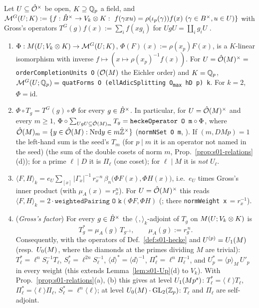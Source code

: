 \begin{lemma}\label{lem:s01-dictionary}
Let $U\subseteq\hat{\mathcal{O}}^\times$ be open, $K\supseteq\mathbb{Q}_p$ a field, and
$\cM^G(U;K):=\{f:\Bhat^\times\to V_k\otimes K:\ f(\gamma xu)=\rho(\iota_p(\gamma))f(x)\ (\gamma\in B^\times,u\in U)\}$ with Gross's operators
$T^G(g)f(x):=\sum_if(xg_i)$ for $UgU=\coprod_ig_iU$ .
\begin{enumerate}[label=(\alph*)]
\item $\Phi:M(U;V_k\otimes K)\to\mathcal{M}^G(U;K)$, $\Phi(F)(x):=\rho(x_p)F(x)$, is a $K$-linear isomorphism with inverse
  $f\mapsto(x\mapsto\rho(x_p)^{-1}f(x))$. For $U=\hat{\mathcal{O}}(M)^\times=$ \texttt{orderCompletionUnits O} ($\mathcal{O}(M)$ the Eichler order) and $K=\mathbb{Q}_p$,
  $\mathcal{M}^G(U;\mathbb{Q}_p)=$ \texttt{quatForms O (ellAdicSplitting O\textsubscript{max} hD p) k}. For $k=2$, $\Phi=\mathrm{id}$.
\item $\Phi\circ T_g=T^G(g)\circ\Phi$ for every $g\in\hat{B}^\times$. In particular, for $U=\hat{\mathcal{O}}(M)^\times$ and every $m\ge1$,
  $\Phi\circ\sum_{UgU\subseteq\hat{\mathcal{O}}(M)_m}T_g=\texttt{heckeOperator O m}\circ\Phi$, where $\hat{\mathcal{O}}(M)_m=\{y\in\hat{\mathcal{O}}(M):\mathrm{Nrd} y\in m\hat{\mathbb{Z}}^\times\}$
  (\texttt{normNSet O m}, ). If $(m,DMp)=1$ the left-hand sum is the seed's $T_m$ (for $p\mid m$ it is an operator not named in the seed) (the sum of the double cosets of norm
  $m$, Prop.~\ref{prop:s01-relations}(d)); for a prime $\ell\mid D$ it is $\Pi_\ell$ (one coset); for $\ell\mid M$ it is \emph{not} $U_\ell$.
\item $\langle F,H\rangle_k=e_U\sum_{[x]}|\Gamma_x|^{-1}\,r_x^{-n}\,\beta_n\big(\Phi F(x),\Phi H(x)\big)$, i.e.\ $e_U$ times Gross's inner product
   (with $\mu_A(x)=r_x^n$). For $U=\hat{\mathcal{O}}(M)^\times$ this reads
  $\langle F,H\rangle_k=2\cdot\texttt{weightedPairing O k}(\Phi F,\Phi H)$ (; there
  \texttt{normWeight x}$\,=r_x^{-1}$).
\item (\emph{Gross's factor}) For every $g\in\hat{B}^\times$ the $\langle\,,\rangle_k$-adjoint of $T_g$ on $M(U;V_k\otimes K)$ is
  \[T_g^*=\mu_A(g)\,T_{g^{-1}},\qquad\mu_A(g):=r_g^{\,n}.\]
  Consequently, with the operators of Def.~\ref{def:s01-hecke} and $U^{(p)}=U_1(M)$ (resp.\ $U_0(M)$, where the diamonds at the primes dividing $M$ are trivial):
  $T_\ell^*=\ell^nS_\ell^{-1}T_\ell$, $S_\ell^*=\ell^{2n}S_\ell^{-1}$, $\langle d\rangle^*=\langle d\rangle^{-1}$, $\Pi_\ell^*=\ell^n\Pi_\ell^{-1}$, and
  $U_p^*=\langle p\rangle_M\,U'_p$ in every weight (this extends Lemma~\ref{lem:s01-Up}(d) to $V_k$). With
  Prop.~\ref{prop:s01-relations}(a), (b) this gives at level $U_1(Mp^s)$: $T_\ell^*=\langle\ell\rangle T_\ell$, $\Pi_\ell^*=\langle\ell\rangle\Pi_\ell$,
  $S_\ell^*=\ell^n\langle\ell\rangle$; at level $U_0(M)\cdot\mathrm{GL}_2(\mathbb{Z}_p)$: $T_\ell$ and $\Pi_\ell$ are self-adjoint.
\end{enumerate}
\end{lemma}
